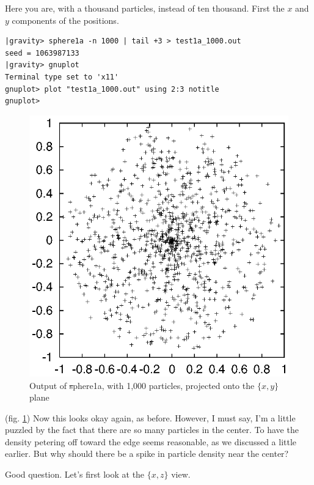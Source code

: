 \carol
Here you are, with a thousand particles, instead of ten thousand.
First the $x$ and $y$ components of the positions.

\cba

\begin{small}
\begin{verbatim}
|gravity> sphere1a -n 1000 | tail +3 > test1a_1000.out
seed = 1063987133
|gravity> gnuplot
Terminal type set to 'x11'
gnuplot> plot "test1a_1000.out" using 2:3 notitle
gnuplot>
\end{verbatim}
\end{small}

\begin{figure}[htb]
\centering
\includegraphics[width=4.5in]{chap9/test1axy1000.ps}
\caption[xy plot of {\st sphere1a} output]
{Output of {\st sphere1a}, with 1,000 particles, projected onto the
$\{x,y\}$ plane}
\label{fig:sphere1axy1000}
\end{figure}

\abc

\bob
(fig. \ref{fig:sphere1axy1000}) 
Now this looks okay again, as before.  However, I must say, I'm a
little puzzled by the fact that there are so many particles in the
center.  To have the density petering off toward the edge seems
reasonable, as we discussed a little earlier.  But why should there be
a spike in particle density near the center?

\carol
Good question.  Let's first look at the $\{x,z\}$ view.

